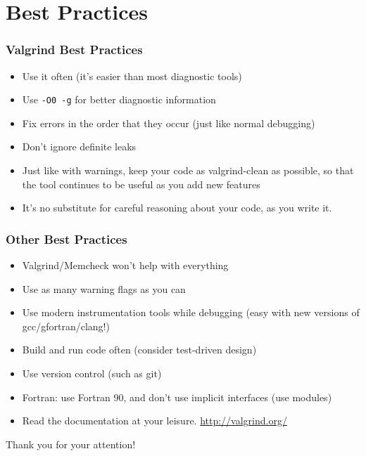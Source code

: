 \documentclass{beamer}
\begin{document}
\section{Best Practices}

\begin{frame}[fragile]
\frametitle{Valgrind Best Practices}
\begin{itemize}
\item Use it often (it's easier than most diagnostic tools)
\item Use \texttt{-O0 -g} for better diagnostic information
\item Fix errors in the order that they occur (just like normal debugging)
\item Don't ignore definite leaks
\item Just like with warnings, keep your code as valgrind-clean as possible, so that the tool continues to be useful as you add new features
\item It's no substitute for careful reasoning about your code, as you write it.
\end{itemize}
\end{frame}

\begin{frame}[fragile]
\frametitle{Other Best Practices}
\begin{itemize}
\item Valgrind/Memcheck won't help with everything
\item Use as many warning flags as you can
\item Use modern instrumentation tools while debugging (easy with new versions of gcc/gfortran/clang!)
\item Build and run code often (consider test-driven design)
\item Use version control (such as git)
\item Fortran: use Fortran 90, and don't use implicit interfaces (use modules)
\item Read the documentation at your leisure. \url{http://valgrind.org/}
\end{itemize}
Thank you for your attention!
\end{frame}
\end{document}
